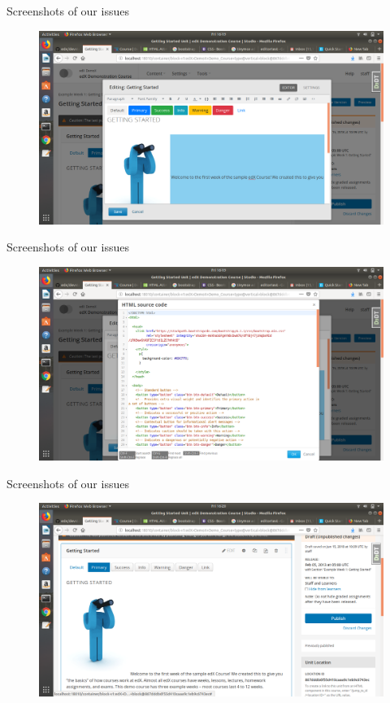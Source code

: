 \documentclass{beamer}
\begin{document}
	\begin{frame}{Screenshots of our issues}
		\begin{figure}
			\includegraphics[width=\linewidth,height=\textheight,keepaspectratio]{./18-06-18/issue-1.png}
		\end{figure}
	\end{frame}
	
	\begin{frame}{Screenshots of our issues}
		\begin{figure}
			\includegraphics[width=\linewidth,height=\textheight,keepaspectratio]{./18-06-18/issue-2.png}
		\end{figure}
	\end{frame}
	
	\begin{frame}{Screenshots of our issues}
		\begin{figure}
			\includegraphics[width=\linewidth,height=\textheight,keepaspectratio]{./18-06-18/issue-3.png}
		\end{figure}
	\end{frame}
	
\end{document}
